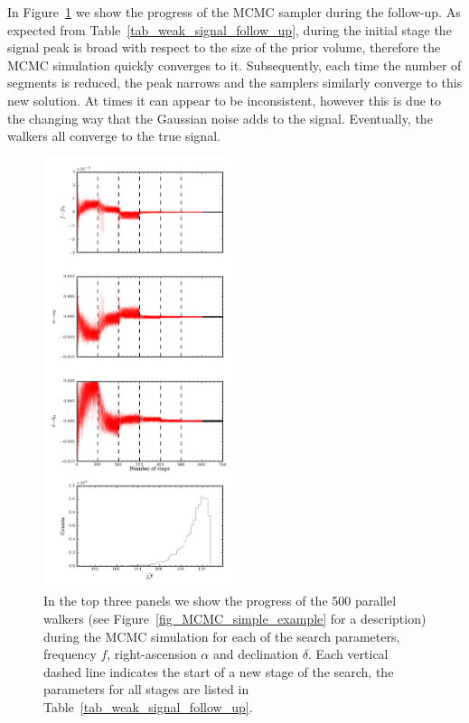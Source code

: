 \documentclass[aps, prd, twocolumn, superscriptaddress, floatfix, showpacs, nofootinbib, longbibliography]{revtex4-1}
\begin{document}
In Figure~\ref{fig_follow_up} we show the progress of the MCMC sampler during
the follow-up.  As expected from Table~\ref{tab_weak_signal_follow_up}, during
the initial stage the signal peak is broad with respect to the size of the
prior volume, therefore the MCMC simulation quickly converges to it. Subsequently,
each time the number of segments is reduced, the peak narrows and the samplers
similarly converge to this new solution. At times it can appear to be inconsistent,
however this is due to the changing way that the Gaussian noise adds to the signal.
Eventually, the walkers all converge to the true signal.
\begin{figure}[htb]
\centering \includegraphics[width=0.5\textwidth]{weak_signal_follow_up_walkers}
\caption{In the top three panels we show the progress of the 500 parallel
walkers (see Figure~\ref{fig_MCMC_simple_example} for a description) during the
MCMC simulation for each of the search parameters, frequency $f$,
right-ascension $\alpha$ and declination $\delta$. Each vertical dashed line
indicates the start of a new stage of the search, the parameters for all stages
are listed in Table~\ref{tab_weak_signal_follow_up}.}
\label{fig_follow_up}
\end{figure}
\end{document}
